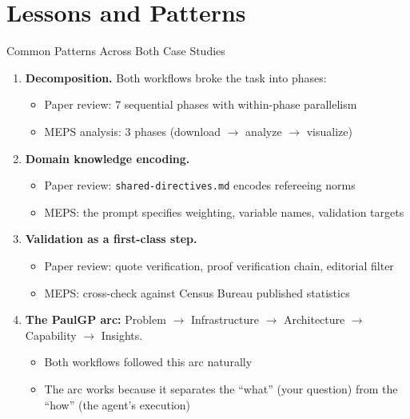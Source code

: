 \documentclass[10pt,english,aspectratio=169]{beamer}
\begin{document}
\section{Lessons and Patterns}

\begin{frame}{Common Patterns Across Both Case Studies}

\begin{enumerate}
    \item \textbf{Decomposition.} Both workflows broke the task into phases:
    \begin{itemize}
        \item Paper review: 7 sequential phases with within-phase parallelism
        \item MEPS analysis: 3 phases (download $\to$ analyze $\to$ visualize)
    \end{itemize}

    \vspace{0.2cm}
    \item \textbf{Domain knowledge encoding.}
    \begin{itemize}
        \item Paper review: \texttt{shared-directives.md} encodes refereeing norms
        \item MEPS: the prompt specifies weighting, variable names, validation targets
    \end{itemize}

    \vspace{0.2cm}
    \item \textbf{Validation as a first-class step.}
    \begin{itemize}
        \item Paper review: quote verification, proof verification chain, editorial filter
        \item MEPS: cross-check against Census Bureau published statistics
    \end{itemize}

    \vspace{0.2cm}
    \item \textbf{The PaulGP arc:} Problem $\to$ Infrastructure $\to$ Architecture $\to$ Capability $\to$ Insights.
    \begin{itemize}
        \item Both workflows followed this arc naturally
        \item The arc works because it separates the ``what'' (your question) from the ``how'' (the agent's execution)
    \end{itemize}
\end{enumerate}

\end{frame}
\end{document}
